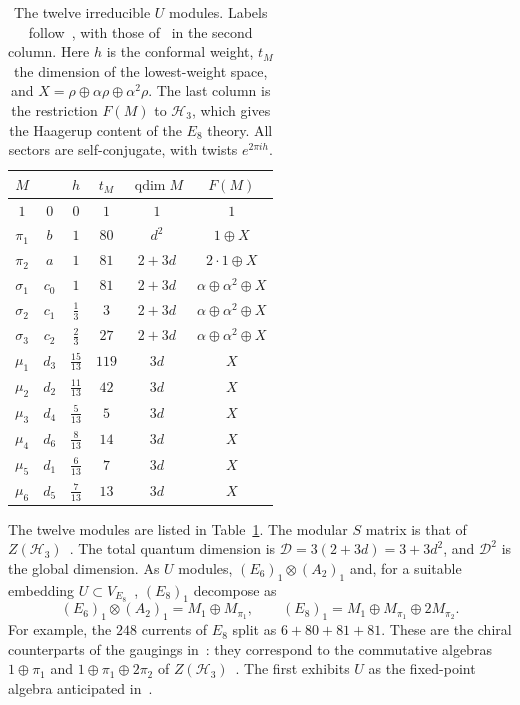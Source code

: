 \documentclass[aps,prl,twocolumn,superscriptaddress,nofootinbib]{revtex4-2}
\newcommand{\cH}{\mathcal H}
\newcommand{\qdim}{\operatorname{qdim}}
\begin{document}
\begin{table}[t]
\caption{The twelve irreducible $U$ modules. Labels follow~\cite{AHKZ},
with those of~\cite{EG} in the second column. Here $h$ is the conformal
weight, $t_M$ the dimension of the lowest-weight space, and
$X=\rho\oplus\alpha\rho\oplus\alpha^2\rho$. The last column is the
restriction $F(M)$ to $\cH_3$, which gives the Haagerup content of the
$E_8$ theory. All sectors are self-conjugate, with twists
$e^{2\pi ih}$.}
\label{tab:sectors}
\begin{ruledtabular}
\begin{tabular}{cccccc}
$M$&\cite{EG}&$h$&$t_M$&$\qdim M$&$F(M)$\\
\hline
$1$&$0$&$0$&$1$&$1$&$1$\\
$\pi_1$&$b$&$1$&$80$&$d^2$&$1\oplus X$\\
$\pi_2$&$a$&$1$&$81$&$2+3d$&$2\cdot1\oplus X$\\
$\sigma_1$&$c_0$&$1$&$81$&$2+3d$&$\alpha\oplus\alpha^2\oplus X$\\
$\sigma_2$&$c_1$&$\tfrac13$&$3$&$2+3d$&$\alpha\oplus\alpha^2\oplus X$\\
$\sigma_3$&$c_2$&$\tfrac23$&$27$&$2+3d$&$\alpha\oplus\alpha^2\oplus X$\\
$\mu_1$&$d_3$&$\tfrac{15}{13}$&$119$&$3d$&$X$\\
$\mu_2$&$d_2$&$\tfrac{11}{13}$&$42$&$3d$&$X$\\
$\mu_3$&$d_4$&$\tfrac{5}{13}$&$5$&$3d$&$X$\\
$\mu_4$&$d_6$&$\tfrac{8}{13}$&$14$&$3d$&$X$\\
$\mu_5$&$d_1$&$\tfrac{6}{13}$&$7$&$3d$&$X$\\
$\mu_6$&$d_5$&$\tfrac{7}{13}$&$13$&$3d$&$X$
\end{tabular}
\end{ruledtabular}
\end{table}

The twelve modules are listed in Table~\ref{tab:sectors}. The modular
$S$ matrix is that of $Z(\cH_3)$~\cite{EG}. The total quantum dimension
is $\mathcal D=3(2+3d)=3+3d^2$, and $\mathcal D^2$ is the global
dimension. As $U$ modules, $(E_6)_1\otimes(A_2)_1$ and, for a suitable
embedding $U\subset V_{E_8}$~\cite{note-H2H3}, $(E_8)_1$ decompose as
\begin{equation}
 (E_6)_1\otimes(A_2)_1=M_1\oplus M_{\pi_1},\qquad
 (E_8)_1=M_1\oplus M_{\pi_1}\oplus2M_{\pi_2}.
 \label{eq:ext}
\end{equation}
For example, the $248$ currents of $E_8$ split as $6+80+81+81$. These
are the chiral counterparts of the gaugings in~\cite{AHKZ}: they
correspond to the commutative algebras $1\oplus\pi_1$ and
$1\oplus\pi_1\oplus2\pi_2$ of $Z(\cH_3)$~\cite{note-H2H3}. The first
exhibits $U$ as the fixed-point algebra anticipated in~\cite{GR}.
\end{document}
